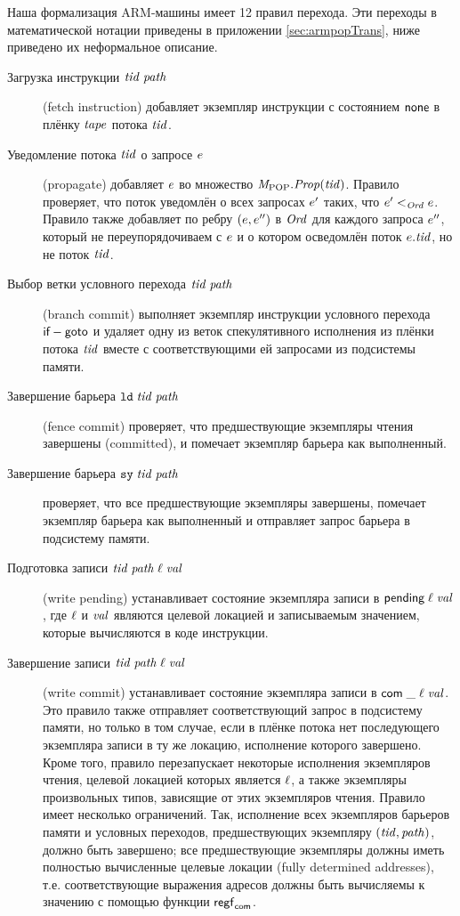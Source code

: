 Наша формализация ARM-машины имеет 12 правил перехода.
Эти переходы в математической нотации приведены в приложении \ref{sec:armpopTrans},
ниже приведено их неформальное описание.
\begin{description}
\item[Загрузка инструкции $\mathit{tid} \; \mathit{path}$] (fetch instruction)
  добавляет экземпляр инструкции с состоянием $\mathsf{none}$
  в плёнку $\mathit{tape}$ потока $\mathit{tid}$.

\item[Уведомление потока $\mathit{tid}$ о запросе $e$] (propagate)
  добавляет $e$ во множество $\mathit{M}_{\mathrm{POP}}.\mathit{Prop}(\mathit{tid})$.
  Правило проверяет, что поток уведомлён о всех запросах $e'$ таких, что $e' <_{\mathit{Ord}} e$.
  Правило также добавляет по ребру $(e, e'')$ в $\mathit{Ord}$ для каждого запроса $e''$,
  который не переупорядочиваем с $e$ и о котором осведомлён поток $e.\mathit{tid}$,
  но не поток $\mathit{tid}$.

\item[Выбор ветки условного перехода $\mathit{tid} \; \mathit{path}$] (branch commit)
  выполняет экземпляр инструкции условного перехода $\textsf{if}-\textsf{goto}$ и
  удаляет одну из веток спекулятивного исполнения из плёнки потока $\mathit{tid}$ вместе
  с соответствующими ей запросами из подсистемы памяти.

\item[Завершение барьера $\mathtt{ld} \; \mathit{tid} \; \mathit{path}$] (fence commit)
  проверяет, что предшествующие экземпляры чтения завершены (committed),
  и помечает экземпляр барьера как выполненный.
\item[Завершение барьера $\mathtt{sy} \; \mathit{tid} \; \mathit{path}$]
  проверяет, что все предшествующие экземпляры завершены,
  помечает экземпляр барьера как выполненный и отправляет запрос барьера
  в подсистему памяти.
  
\item[Подготовка записи $\mathit{tid} \; \mathit{path} \; \ell \; \mathit{val}$] (write pending)
  устанавливает состояние экземпляра записи в $\textsf{pending} \; \ell \; \mathit{val}$,
  где $\ell$ и $\mathit{val}$ являются целевой локацией и записываемым значением,
  которые вычисляются в коде инструкции.

\item[Завершение записи $\mathit{tid} \; \mathit{path} \; \ell \; \mathit{val}$] (write commit)
  устанавливает состояние экземпляра записи в $\mathsf{com} \; \_ \; \ell \; \mathit{val}$.
  Это правило также отправляет соответствующий запрос в подсистему памяти,
  но только в том случае, если в плёнке потока нет последующего экземпляра записи
  в ту же локацию, исполнение которого завершено.
  Кроме того, правило перезапускает некоторые исполнения экземпляров чтения, целевой
  локацией которых является $\ell$, а также экземпляры произвольных типов, зависящие
  от этих экземпляров чтения.
  Правило имеет несколько ограничений.
  Так, исполнение всех экземпляров барьеров памяти и условных
  переходов, предшествующих экземпляру $(\mathit{tid}, \mathit{path})$, должно быть завершено;
  все предшествующие экземпляры должны иметь полностью вычисленные целевые
  локации (fully determined addresses), т.е. соответствующие выражения адресов
  должны быть вычисляемы к значению с помощью функции $\mathsf{regf}_\mathsf{com}$.


\end{description}
